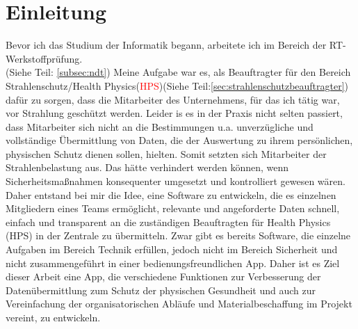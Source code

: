 \chapter{Einleitung}
\label{sec:einleitung}
Bevor ich das Studium der Informatik begann, arbeitete ich im Bereich der RT-Werkstoffprüfung.\\(Siehe Teil: \ref{subsec:ndt}) Meine Aufgabe war es, als Beauftragter für den Bereich Strahlenschutz/Health Physics(\textcolor{red}{HPS})(Siehe Teil:\ref{sec:strahlenschutzbeauftragter}) dafür zu sorgen, dass die Mitarbeiter des Unternehmens, für das ich tätig war, vor Strahlung geschützt werden.
Leider is es in der Praxis nicht selten passiert, dass Mitarbeiter sich nicht an die Bestimmungen
u.a. unverzügliche und vollständige Übermittlung von Daten, die der Auswertung zu ihrem persönlichen, physischen Schutz dienen sollen, hielten.
Somit setzten sich Mitarbeiter der Strahlenbelastung aus.
Das hätte verhindert werden können, wenn Sicherheitsmaßnahmen konsequenter umgesetzt und kontrolliert gewesen wären.
Daher entstand bei mir die Idee, eine Software zu entwickeln, die es einzelnen Mitgliedern eines Teams ermöglicht, relevante und angeforderte Daten schnell, einfach und transparent an die zuständigen Beauftragten für Health Physics (HPS) in der Zentrale zu übermitteln.
Zwar gibt es bereits Software, die einzelne Aufgaben im Bereich Technik erfüllen, jedoch nicht im Bereich Sicherheit und nicht zusammengeführt in einer bedienungsfreundlichen App.
Daher ist es Ziel dieser Arbeit eine App, die verschiedene Funktionen zur Verbesserung der Datenübermittlung zum Schutz der physischen Gesundheit und auch zur Vereinfachung der organisatorischen Abläufe und Materialbeschaffung im Projekt vereint, zu entwickeln.  
